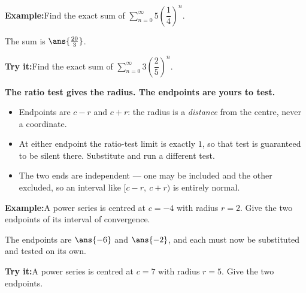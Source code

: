 \documentclass[12pt]{article}
\begin{document}
\begin{examplebox}
\textbf{Example:}\quad Find the exact sum of
$\displaystyle\sum_{n=0}^{\infty} 5\left(\dfrac{1}{4}\right)^{n}$.



The sum is $\ans{\tfrac{20}{3}}$.
\end{examplebox}

\begin{tryitbox}
\textbf{Try it:}\quad Find the exact sum of
$\displaystyle\sum_{n=0}^{\infty} 3\left(\dfrac{2}{5}\right)^{n}$.

\end{tryitbox}


\begin{formulabox}
\textbf{The ratio test gives the radius. The endpoints are yours to test.}
\begin{itemize}[leftmargin=0.8cm, itemsep=1pt, topsep=2pt]
  \item Endpoints are $c - r$ and $c + r$: the radius is a \emph{distance} from
        the centre, never a coordinate.
  \item At either endpoint the ratio-test limit is exactly $1$, so that test is
        guaranteed to be silent there. Substitute and run a different test.
  \item The two ends are independent --- one may be included and the other
        excluded, so an interval like $[c - r,\ c + r)$ is entirely normal.
\end{itemize}
\end{formulabox}

\begin{examplebox}
\textbf{Example:}\quad A power series is centred at $c = -4$ with radius
$r = 2$. Give the two endpoints of its interval of convergence.



The endpoints are $\ans{-6}$ and $\ans{-2}$, and each must now be substituted and
tested on its own.
\end{examplebox}

\begin{tryitbox}
\textbf{Try it:}\quad A power series is centred at $c = 7$ with radius $r = 5$.
Give the two endpoints.

\end{tryitbox}
\end{document}
